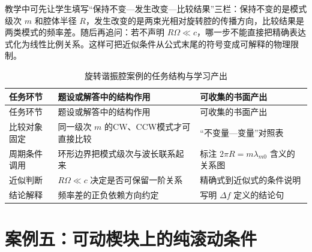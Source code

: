 \documentclass[
  12pt,
  a4paper]{ctexbook}
\begin{document}
教学中可先让学生填写``保持不变---发生改变---比较结果''三栏：保持不变的是模式级次
\(m\) 和腔体半径
\(R\)，发生改变的是两束光相对旋转腔的传播方向，比较结果是两类模式的频率差。随后再追问：若不声明
\(R\Omega\ll c\)，哪一步不能直接把精确表达式化为线性比例关系。这样可把近似条件从公式末尾的符号变成可解释的物理限制。

\begin{longtable}[]{@{}
  >{\raggedright\arraybackslash}p{}
  >{\raggedright\arraybackslash}p{}
  >{\raggedright\arraybackslash}p{}@{}}
\caption{旋转谐振腔案例的任务结构与学习产出}\tabularnewline
\toprule\noalign{}
\rowcolor{ThesisPale}
\begin{minipage}[b]{\linewidth}\raggedright
任务环节
\end{minipage} & \begin{minipage}[b]{\linewidth}\raggedright
题设或解答中的结构作用
\end{minipage} & \begin{minipage}[b]{\linewidth}\raggedright
可收集的书面产出
\end{minipage} \\
\midrule\noalign{}
\endfirsthead
\toprule\noalign{}
\rowcolor{ThesisPale}
\begin{minipage}[b]{\linewidth}\raggedright
任务环节
\end{minipage} & \begin{minipage}[b]{\linewidth}\raggedright
题设或解答中的结构作用
\end{minipage} & \begin{minipage}[b]{\linewidth}\raggedright
可收集的书面产出
\end{minipage} \\
\midrule\noalign{}
\endhead
\bottomrule\noalign{}
\endlastfoot
比较对象固定 & 同一级次 \(m\) 的CW、CCW模式才可直接比较 &
``不变量---变量''对照表 \\
周期条件调用 & 环形边界把模式级次与波长联系起来 & 标注
\(2\pi R=m\lambda_{m0}\) 含义的关系图 \\
近似判断 & \(R\Omega\ll c\) 决定是否可保留一阶关系 &
精确式到近似式的条件说明 \\
结论解释 & 频率差的正负依赖方向约定 & 写明 \(\Delta f\) 定义的结论句 \\
\end{longtable}

\section{案例五：可动楔块上的纯滚动条件}\label{ux6848ux4f8bux4e94ux53efux52a8ux6954ux5757ux4e0aux7684ux7eafux6edaux52a8ux6761ux4ef6}
\end{document}
